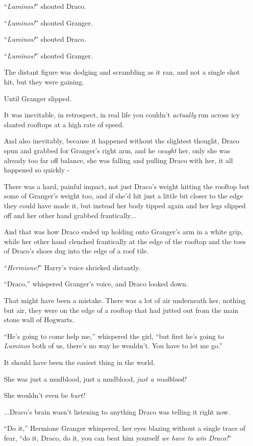 ``\emph{Luminos!}'' shouted Draco.

``\emph{Luminos!}'' shouted Granger.

``\emph{Luminos!}'' shouted Draco.

``\emph{Luminos!}'' shouted Granger.

The distant figure was dodging and scrambling as it ran, and not a single shot hit, but they were gaining.

Until Granger slipped.

It was inevitable, in retrospect, in real life you couldn't \emph{actually} run across icy slanted rooftops at a high rate of speed.

And also inevitably, because it happened without the slightest thought, Draco spun and grabbed for Granger's right arm, and he \emph{caught} her, only she was already too far off balance, she was falling and pulling Draco with her, it all happened so quickly -

There was a hard, painful impact, not just Draco's weight hitting the rooftop but some of Granger's weight too, and if she'd hit just a little bit closer to the edge they could have made it, but instead her body tipped again and her legs slipped off and her other hand grabbed frantically...

And that was how Draco ended up holding onto Granger's arm in a white grip, while her other hand clenched frantically at the edge of the rooftop and the toes of Draco's shoes dug into the edge of a roof tile.

``\emph{Hermione!}'' Harry's voice shrieked distantly.

``Draco,'' whispered Granger's voice, and Draco looked down.

That might have been a mistake. There was a lot of air underneath her, nothing but air, they were on the edge of a rooftop that had jutted out from the main stone wall of Hogwarts.

``He's going to come help me,'' whispered the girl, ``but first he's going to \emph{Luminos} both of us, there's no way he wouldn't. You have to let me go.''

It should have been the easiest thing in the world.

She was just a mudblood, just a mudblood, \emph{just a mudblood!}

She wouldn't even be \emph{hurt!}

...Draco's brain wasn't listening to anything Draco was telling it right now.

``Do it,'' Hermione Granger whispered, her eyes blazing without a single trace of fear, ``do it, Draco, do it, you can beat him yourself \emph{we have to win Draco!}''

